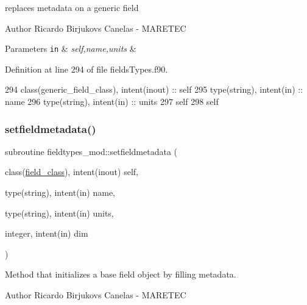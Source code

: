 replaces metadata on a generic field 

\begin{DoxyAuthor}{Author}
Ricardo Birjukovs Canelas -\/ M\+A\+R\+E\+T\+EC 
\end{DoxyAuthor}

\begin{DoxyParams}[1]{Parameters}
\mbox{\tt in}  & {\em self,name,units} & \\
\hline
\end{DoxyParams}


Definition at line 294 of file fields\+Types.\+f90.


\begin{DoxyCode}
294     \textcolor{keywordtype}{class}(generic\_field\_class), \textcolor{keywordtype}{intent(inout)} :: self
295     \textcolor{keywordtype}{type}(string), \textcolor{keywordtype}{intent(in)} :: name
296     \textcolor{keywordtype}{type}(string), \textcolor{keywordtype}{intent(in)} :: units
297     self%
298     self%
\end{DoxyCode}
\mbox{\label{namespacefieldtypes__mod_abc601ce9f8a974f426e876cc4c02e2a2}} 
\subsubsection{\texorpdfstring{setfieldmetadata()}{setfieldmetadata()}}
{\footnotesize\ttfamily subroutine fieldtypes\+\_\+mod\+::setfieldmetadata (\begin{DoxyParamCaption}\item[{class(\mbox{\hyperlink{structfieldtypes__mod_1_1field__class}{field\+\_\+class}}), intent(inout)}]{self,  }\item[{type(string), intent(in)}]{name,  }\item[{type(string), intent(in)}]{units,  }\item[{integer, intent(in)}]{dim }\end{DoxyParamCaption})\hspace{0.3cm}{\ttfamily [private]}}



Method that initializes a base field object by filling metadata. 

\begin{DoxyAuthor}{Author}
Ricardo Birjukovs Canelas -\/ M\+A\+R\+E\+T\+EC 
\end{DoxyAuthor}

